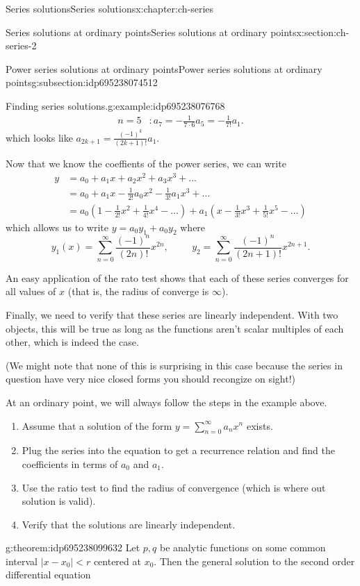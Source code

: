 \documentclass[oneside,10pt,]{book}
\numberwithin{equation}{section}
\newcommand{\abs}[1]{\left\vert#1\right\vert}
\numberwithin{equation}{section}
\newcommand{\ps}{\displaystyle \sum_{n=0}^\infty a_n x^n}
\newcommand{\lt}{<}
\newcommand{\amp}{&}
\begin{document}
\begin{chapterptx}{Series solutions}{}{Series solutions}{}{}{x:chapter:ch-series}
\begin{sectionptx}{Series solutions at ordinary points}{}{Series solutions at ordinary points}{}{}{x:section:ch-series-2}
\begin{subsectionptx}{Power series solutions at ordinary points}{}{Power series solutions at ordinary points}{}{}{g:subsection:idp695238074512}
\begin{example}{Finding series solutions.}{g:example:idp695238076768}
\begin{align*}
n=5\amp: a_7 = -\frac{1}{7 \cdot 6} a_5 = -\frac{1}{7!} a_1.
\end{align*}
which looks like \(a_{2k+1} = \frac{(-1)^k}{(2k+1)!} a_1\).%
\par
Now that we know the coeffients of the power series, we can write%
\begin{align*}
y \amp= a_0 + a_1 x + a_2 x^2 + a_3 x^3 + \ldots\\
\amp= a_0 + a_1 x - \frac{1}{2!} a_0 x^2 - \frac{1}{3!} a_1 x^3 + \ldots\\
\amp = a_0 ( 1 - \frac{1}{2!} x^2 + \frac{1}{4!} x^4 - \ldots) + a_1 (x - \frac{1}{3!} x^3 + \frac{1}{5!}x^5 - \ldots)
\end{align*}
which allows us to write \(y = a_0 y_1 + a_0 y_2\) where%
\begin{equation*}
y_1(x) = \sum_{n=0}^\infty \frac{(-1)^n}{(2n)!} x^{2n},  \hspace{1cm} y_2 = \sum_{n=0}^\infty \frac{(-1)^n}{(2n+1)!} x^{2n+1}.
\end{equation*}
%
\par
An easy application of the rato test shows that each of these series converges for all values of \(x\) (that is, the radius of converge is \(\infty\)).%
\par
Finally, we need to verify that these series are linearly independent. With two objects, this will be true as long as the functions aren't scalar multiples of each other, which is indeed the case.%
\par
(We might note that none of this is surprising in this case because the series in question have very nice closed forms you should recongize on sight!)%
\end{example}
At an ordinary point, we will always follow the steps in the example above.%
\begin{enumerate}
\item{}Assume that a solution of the form \(y = \ps\) exists.%
\item{}Plug the series into the equation to get a recurrence relation and find the coefficients in terms of \(a_0\) and \(a_1\).%
\item{}Use the ratio test to find the radius of convergence (which is where out solution is valid).%
\item{}Verify that the solutions are linearly independent.%
\end{enumerate}
%
\begin{theorem}{}{}{g:theorem:idp695238099632}%
Let \(p, q\) be analytic functions on some common interval \(\abs{x - x_0} \lt r\) centered at \(x_0\). Then the general solution to the second order differential equation%

\end{theorem}
\end{subsectionptx}
\end{sectionptx}
\end{chapterptx}
\end{document}
